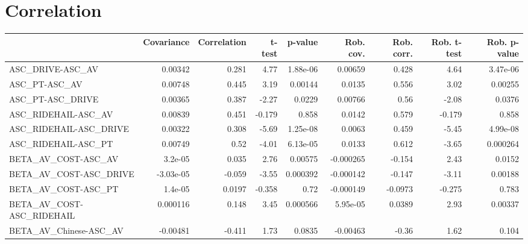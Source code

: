 \section{Correlation}
\begin{tabular}{lrrrrrrrr}
\toprule
{} &  Covariance &  Correlation &    t-test &  p-value &  Rob. cov. &  Rob. corr. &  Rob. t-test &  Rob. p-value \\
\midrule
ASC\_DRIVE-ASC\_AV                                   &     0.00342 &        0.281 &      4.77 & 1.88e-06 &    0.00659 &       0.428 &         4.64 &      3.47e-06 \\
ASC\_PT-ASC\_AV                                      &     0.00748 &        0.445 &      3.19 &  0.00144 &     0.0135 &       0.556 &         3.02 &       0.00255 \\
ASC\_PT-ASC\_DRIVE                                   &     0.00365 &        0.387 &     -2.27 &   0.0229 &    0.00766 &        0.56 &        -2.08 &        0.0376 \\
ASC\_RIDEHAIL-ASC\_AV                                &     0.00839 &        0.451 &    -0.179 &    0.858 &     0.0142 &       0.579 &       -0.179 &         0.858 \\
ASC\_RIDEHAIL-ASC\_DRIVE                             &     0.00322 &        0.308 &     -5.69 & 1.25e-08 &     0.0063 &       0.459 &        -5.45 &      4.99e-08 \\
ASC\_RIDEHAIL-ASC\_PT                                &     0.00749 &         0.52 &     -4.01 & 6.13e-05 &     0.0133 &       0.612 &        -3.65 &      0.000264 \\
BETA\_AV\_COST-ASC\_AV                                &     3.2e-05 &        0.035 &      2.76 &  0.00575 &  -0.000265 &      -0.154 &         2.43 &        0.0152 \\
BETA\_AV\_COST-ASC\_DRIVE                             &   -3.03e-05 &       -0.059 &     -3.55 & 0.000392 &  -0.000142 &      -0.147 &        -3.11 &       0.00188 \\
BETA\_AV\_COST-ASC\_PT                                &     1.4e-05 &       0.0197 &    -0.358 &     0.72 &  -0.000149 &     -0.0973 &       -0.275 &         0.783 \\
BETA\_AV\_COST-ASC\_RIDEHAIL                          &    0.000116 &        0.148 &      3.45 & 0.000566 &   5.95e-05 &      0.0389 &         2.93 &       0.00337 \\
BETA\_AV\_Chinese-ASC\_AV                             &    -0.00481 &       -0.411 &      1.73 &   0.0835 &   -0.00463 &       -0.36 &         1.62 &         0.104 \\

\end{tabular}
